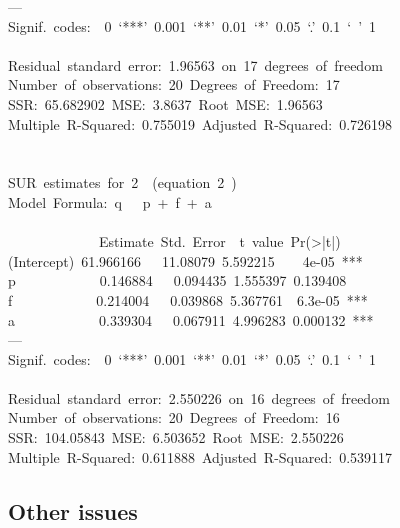 \documentclass[article]{jss}
\begin{document}
{---~\\
Signif.~codes:~~0~`***'~0.001~`**'~0.01~`*'~0.05~`.'~0.1~`~'~1~\\
~\\
Residual~standard~error:~1.96563~on~17~degrees~of~freedom~\\
Number~of~observations:~20~Degrees~of~Freedom:~17~\\
SSR:~65.682902~MSE:~3.8637~Root~MSE:~1.96563~\\
Multiple~R-Squared:~0.755019~Adjusted~R-Squared:~0.726198~\\
~\\
~\\
SUR~estimates~for~2~~(equation~2~)~\\
Model~Formula:~q~~~p~+~f~+~a\\
\\
\mbox{}~~~~~~~~~~~~~Estimate~Std.~Error~~t~value~Pr(>|t|)~\\
(Intercept)~61.966166~~~11.08079~5.592215~~~~4e-05~***~\\
p~~~~~~~~~~~~0.146884~~~0.094435~1.555397~0.139408~\\
f~~~~~~~~~~~~0.214004~~~0.039868~5.367761~~6.3e-05~***~\\
a~~~~~~~~~~~~0.339304~~~0.067911~4.996283~0.000132~***~\\
---~\\
Signif.~codes:~~0~`***'~0.001~`**'~0.01~`*'~0.05~`.'~0.1~`~'~1~\\
~\\
Residual~standard~error:~2.550226~on~16~degrees~of~freedom~\\
Number~of~observations:~20~Degrees~of~Freedom:~16~\\
SSR:~104.05843~MSE:~6.503652~Root~MSE:~2.550226~\\
Multiple~R-Squared:~0.611888~Adjusted~R-Squared:~0.539117~\\
}



\subsection{Other issues}
\end{document}
